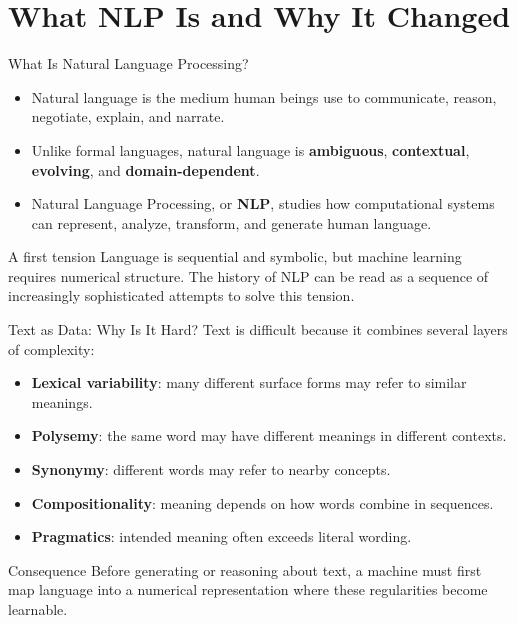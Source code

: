 \documentclass[aspectratio=169]{beamer}
\begin{document}
\section{What NLP Is and Why It Changed}
%
\begin{frame}{What Is Natural Language Processing?}
\begin{itemize}
    \item Natural language is the medium human beings use to communicate, reason, negotiate, explain, and narrate.
    \item Unlike formal languages, natural language is \textbf{ambiguous}, \textbf{contextual}, \textbf{evolving}, and \textbf{domain-dependent}.
    \item Natural Language Processing, or \textbf{NLP}, studies how computational systems can represent, analyze, transform, and generate human language.
\end{itemize}

\vspace{0.2cm}
\begin{block}{A first tension}
Language is sequential and symbolic, but machine learning requires numerical structure. The history of NLP can be read as a sequence of increasingly sophisticated attempts to solve this tension.
\end{block}
\end{frame}
%
%
\begin{frame}{Text as Data: Why Is It Hard?}
Text is difficult because it combines several layers of complexity:
\begin{itemize}
    \item \textbf{Lexical variability}: many different surface forms may refer to similar meanings.
    \item \textbf{Polysemy}: the same word may have different meanings in different contexts.
    \item \textbf{Synonymy}: different words may refer to nearby concepts.
    \item \textbf{Compositionality}: meaning depends on how words combine in sequences.
    \item \textbf{Pragmatics}: intended meaning often exceeds literal wording.
\end{itemize}

\vspace{0.1cm}
\begin{alertblock}{Consequence}
Before generating or reasoning about text, a machine must first map language into a numerical representation where these regularities become learnable.
\end{alertblock}
\end{frame}
\end{document}
